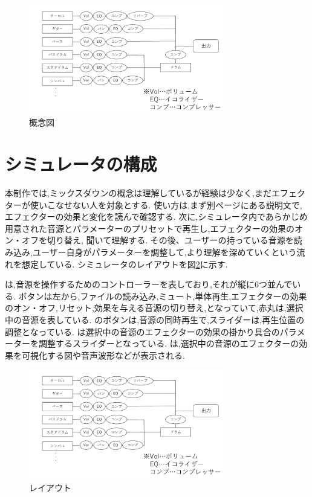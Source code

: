 \documentclass[twocolumn,10pt,a4j]{ltjsarticle}
\begin{document}
\begin{figure}[h]
\centering
 \includegraphics[width=85mm]{./figures/gainen.pdf}
 \caption{概念図}
 \label{fig:gainen}
\end{figure}

\section{シミュレータの構成}
本制作では,ミックスダウンの概念は理解しているが経験は少なく,まだエフェクターが使いこなせない人を対象とする.
使い方は,まず別ページにある説明文で,エフェクターの効果と変化を読んで確認する.
次に,シミュレータ内であらかじめ用意された音源とパラメーターのプリセットで再生し,エフェクターの効果のオン・オフを切り替え, 聞いて理解する.
その後、ユーザーの持っている音源を読み込み,ユーザー自身がパラメーターを調整して,より理解を深めていくという流れを想定している.
シミュレータのレイアウトを図\ref{fig:layout}に示す.

は,音源を操作するためのコントローラーを表しており,それが縦に6つ並んでいる.
ボタンは左から,ファイルの読み込み,ミュート,単体再生,エフェクターの効果のオン・オフ,リセット,効果を与える音源の切り替え,となっていて,赤丸は,選択中の音源を表している.
のボタンは,音源の同時再生で,スライダーは,再生位置の調整となっている.
は選択中の音源のエフェクターの効果の掛かり具合のパラメーターを調整するスライダーとなっている.
は,選択中の音源のエフェクターの効果を可視化する図や音声波形などが表示される.

\begin{figure}[h]
\centering
 \includegraphics[width=85mm]{./figures/gainen.pdf}
 \caption{レイアウト}
 \label{fig:layout}
\end{figure}
\end{document}
